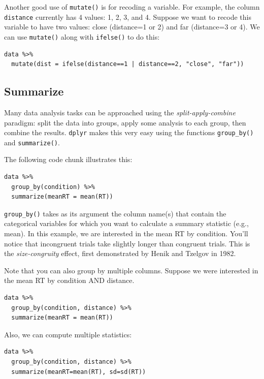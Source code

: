 \documentclass[11pt]{article}
\begin{document}
Another good use of \texttt{mutate()} is for recoding a variable.  For example, the column \texttt{distance} currently has 4 values: 1, 2, 3, and 4.  Suppose we want to recode this variable to have two values: close (distance=1 or 2) and far (distance=3 or 4).  We can use \texttt{mutate()} along with \texttt{ifelse()} to do this:

\begin{verbatim}
data %>%
  mutate(dist = ifelse(distance==1 | distance==2, "close", "far"))
\end{verbatim}

\subsection*{Summarize}
\label{sec-3-4}

Many data analysis tasks can be approached using the \emph{split-apply-combine} paradigm: split the data into groups, apply some analysis to each group, then combine the results.  \texttt{dplyr} makes this very easy using the functions \texttt{group\_by()} and \texttt{summarize()}.

The following code chunk illustrates this:

\begin{verbatim}
data %>%
  group_by(condition) %>%
  summarize(meanRT = mean(RT))
\end{verbatim}

\texttt{group\_by()} takes as its argument the column name(s) that contain the categorical variables for which you want to calculate a summary statistic (e.g., mean).  In this example, we are interested in the mean RT by condition.  You'll notice that incongruent trials take slightly longer than congruent trials.  This is the \emph{size-congruity} effect, first demonstrated by Henik and Tzelgov in 1982.

Note that you can also group by multiple columns.  Suppose we were interested in the mean RT by condition AND distance.

\begin{verbatim}
data %>%
  group_by(condition, distance) %>%
  summarize(meanRT = mean(RT))
\end{verbatim}

Also, we can compute multiple statistics:

\begin{verbatim}
data %>%
  group_by(condition, distance) %>%
  summarize(meanRT=mean(RT), sd=sd(RT))
\end{verbatim}
\end{document}
